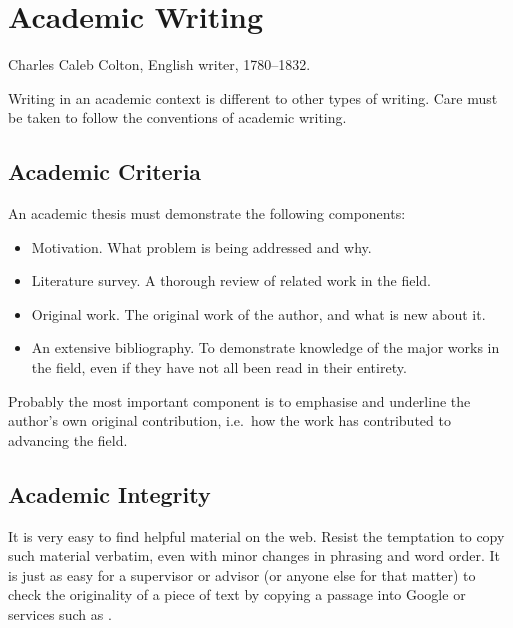 %
%
% 
% 
% 


\chapter{Academic Writing}

\label{chap:Academic}


{
Charles Caleb Colton, English writer, 1780--1832.
}



Writing in an academic context is different to other types of
writing. Care must be taken to follow the conventions of
academic writing.



\section{Academic Criteria}

An academic thesis must demonstrate the following components:
\begin{itemize}
\item Motivation. What problem is being addressed and why.

\item Literature survey. A thorough review of related work in the field.

\item Original work. The original work of the author, and what is new
  about it.

\item An extensive bibliography. To demonstrate knowledge of the major
  works in the field, even if they have not all been read in their
  entirety.
\end{itemize}
Probably the most important component is to emphasise and underline
the author's own original contribution, i.e.\ how the work has
contributed to advancing the field.



\section{Academic Integrity}

It is very easy to find helpful material on the web. Resist the
temptation to copy such material verbatim, even with minor changes in
phrasing and word order. It is just as easy for a supervisor or
advisor (or anyone else for that matter) to check the originality of a
piece of text by copying a passage into Google or services such as
\parencite{PlagiarismOrg}.

